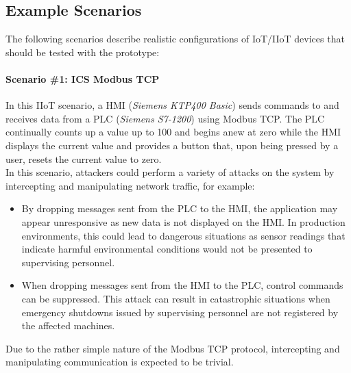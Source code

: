 \subsection{Example Scenarios}
The following scenarios describe realistic configurations of \ac{IoT}/\ac{IIoT} devices that should be tested with the prototype:

\paragraph{Scenario \#1: \ac{ICS} Modbus \ac{TCP}}
In this \ac{IIoT} scenario, a \ac{HMI} (\emph{Siemens KTP400 Basic}) sends commands to and receives data from a \ac{PLC} (\emph{Siemens S7-1200}) using Modbus \ac{TCP}. The \ac{PLC} continually counts up a value up to 100 and begins anew at zero while the \ac{HMI} displays the current value and provides a button that, upon being pressed by a user, resets the current value to zero. \\
In this scenario, attackers could perform a variety of attacks on the system by intercepting and manipulating network traffic, for example:
\begin{itemize}
    \item By dropping messages sent from the \ac{PLC} to the \ac{HMI}, the application may appear unresponsive as new data is not displayed on the \ac{HMI}. In production environments, this could lead to dangerous situations as sensor readings that indicate harmful environmental conditions would not be presented to supervising personnel.
    \item When dropping messages sent from the \ac{HMI} to the \ac{PLC}, control commands can be suppressed. This attack can result in catastrophic situations when emergency shutdowns issued by supervising personnel are not registered by the affected machines.
\end{itemize}

Due to the rather simple nature of the Modbus \ac{TCP} protocol, intercepting and manipulating communication is expected to be trivial. %


